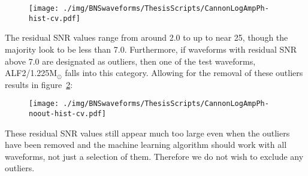 \begin{figure}[H]
	\centering
	\texttt{[image: ./img/BNSwaveforms/ThesisScripts/CannonLogAmpPh-hist-cv.pdf]} 
	\caption[\protect]{\protect}
	\label{fig:CannonLogAmpPh-hist-cv}
\end{figure}
The residual SNR values range from around 2.0 to up to near 25, though the majority look to be less than 7.0. Furthermore, if waveforms with residual SNR above 7.0 are designated as outliers, then one of the test waveforms, ALF2/1.225M$_\odot$ falls into this category. Allowing for the removal of these outliers results in figure~\ref{fig:CannonLogAmpPh-noout-hist-cv}:
\begin{figure}[H]
	\centering
	\texttt{[image: ./img/BNSwaveforms/ThesisScripts/CannonLogAmpPh-noout-hist-cv.pdf]} 
	\caption[\protect]{\protect}
	\label{fig:CannonLogAmpPh-noout-hist-cv}
\end{figure}
These residual SNR values still appear much too large even when the outliers have been removed and the machine learning algorithm should work with all waveforms, not just a selection of them. Therefore we do not wish to exclude any outliers. 

